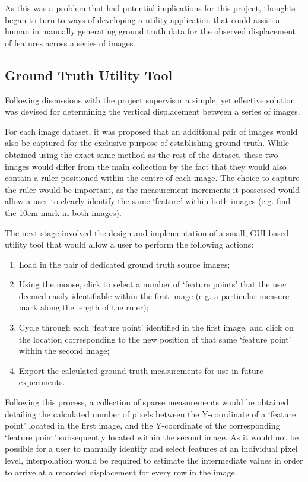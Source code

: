 As this was a problem that had potential implications for this project, thoughts began to turn to ways of developing a utility application that could assist a human in manually generating ground truth data for the observed displacement of features across a series of images. 

\subsection{Ground Truth Utility Tool}

Following discussions with the project supervisor a simple, yet effective solution was devised for determining the vertical displacement between a series of images. 

For each image dataset, it was proposed that an additional pair of images would also be captured for the exclusive purpose of establishing ground truth. While obtained using the exact same method as the rest of the dataset, these two images would differ from the main collection by the fact that they would also contain a ruler positioned within the centre of each image. The choice to capture the ruler would be important, as the measurement increments it possessed would allow a user to clearly identify the same `feature' within both images (e.g. find the 10cm mark in both images).

The next stage involved the design and implementation of a small, GUI-based utility tool that would allow a user to perform the following actions:

\begin{enumerate}
	\item Load in the pair of dedicated ground truth source images;
	\item Using the mouse, click to select a number of `feature points' that the user deemed easily-identifiable within the first image (e.g. a particular measure mark along the length of the ruler);
	\item Cycle through each `feature point' identified in the first image, and click on the location corresponding to the new position of that same `feature point' within the second image;
	\item Export the calculated ground truth measurements for use in future experiments. 
\end{enumerate}


Following this process, a collection of sparse measurements would be obtained detailing the calculated number of pixels between the Y-coordinate of a `feature point' located in the first image, and the Y-coordinate of the corresponding `feature point' subsequently located within the second image. As it would not be possible for a user to manually identify and select features at an individual pixel level, interpolation would be required to estimate the intermediate values in order to arrive at a recorded displacement for every row in the image.

